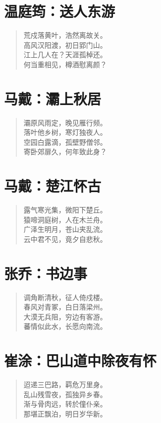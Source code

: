 \documentclass[12pt,oneside]{book}
\newenvironment{shici}{%
\begin{verse}\centering\yanti\large\hspace{12pt}}{\end{verse}}
\begin{document}
\begin{common-format}
\chapter{温庭筠：送人东游}
\begin{shici}
荒戍落黄叶，浩然离故关。\\
高风汉阳渡，初日郢门山。\\
江上几人在？天涯孤棹还。\\
何当重相见，樽酒慰离颜？
\end{shici}

\chapter{马戴：灞上秋居}
\begin{shici}
灞原风雨定，晚见雁行频。\\
落叶他乡树，寒灯独夜人。\\
空园白露滴，孤壁野僧邻。\\
寄卧郊扉久，何年致此身？
\end{shici}

\chapter{马戴：楚江怀古}
\begin{shici}
露气寒光集，微阳下楚丘。\\
猿啼洞庭树，人在木兰舟。\\
广泽生明月，苍山夹乱流。\\
云中君不见，竟夕自悲秋。
\end{shici}

\chapter{张乔：书边事}
\begin{shici}
调角断清秋，征人倚戍楼。\\
春风对青冢，白日落梁州。\\
大漠无兵阻，穷边有客游。\\
蕃情似此水，长愿向南流。
\end{shici}

\chapter{崔涂：巴山道中除夜有怀}
\begin{shici}
迢递三巴路，羁危万里身。\\
乱山残雪夜，孤独异乡春。\\
渐与骨肉远，转於僮仆亲。\\
那堪正飘泊，明日岁华新。
\end{shici}


\end{common-format}
\end{document}
